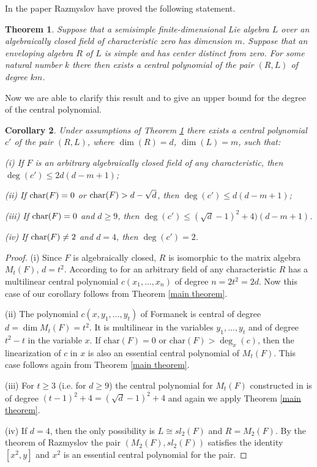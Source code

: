 \documentclass[10]{amsart}
\newtheorem{theorem}{Theorem}[section]
\newtheorem{corollary}[theorem]{Corollary}
\theoremstyle{definition}
\begin{document}
In the paper \cite{R2} Razmyslov have proved the following statement.

\begin{theorem}\label{Razm}
Suppose that a semisimple finite-dimensional Lie algebra $L$ over an
algebraically closed field of characteristic zero has dimension $m$. Suppose that an enveloping
algebra $R$ of $L$ is simple and has center distinct from zero. For some natural
number $k$ there then exists a central polynomial of the pair $(R,L)$ of degree $km$.
\end{theorem}

Now we are able to clarify this result and to give an upper bound for the degree of the central polynomial.

\begin{corollary}\label{upper bound}
Under assumptions of Theorem \ref{Razm} there exists a central polynomial $c'$ of the pair $(R,L)$, where $\dim(R)=d$, $\dim(L)=m$, such that:

{\rm (i)} If $F$ is an arbitrary algebraically closed field of any characteristic, then $\deg(c')\leq 2d(d-m+1)$;

{\rm (ii)} If $\text{\rm char}(F)=0$ or $\text{\rm char}(F)>d-\sqrt{d}$, then $\deg(c')\leq d(d-m+1)$;

{\rm (iii)} If $\text{\rm char}(F)=0$ and $d\geq 9$, then $\deg(c')\leq (\sqrt{d}-1)^2+4)(d-m+1)$.

{\rm (iv)} If $\text{\rm char}(F)\not=2$ and $d=4$, then $\deg(c')=2$.
\end{corollary}

\begin{proof}
(i) Since $F$ is algebraically closed, $R$ is isomorphic to the matrix algebra $M_t(F)$, $d=t^2$.
According to \cite{F3} for an arbitrary field of any characteristic $R$ has a multilinear central polynomial
$c(x_1,\ldots,x_n)$ of degree $n=2t^2=2d$. Now this case of our corollary follows from Theorem
\ref{main theorem}.

(ii) The polynomial $c(x,y_1,\ldots,y_t)$ of Formanek \cite{F1} is central of degree $d=\dim M_t(F)=t^2$. It is multilinear in the variables
$y_1,\ldots,y_t$ and of degree $t^2-t$ in the variable $x$. If $\text{char}(F)=0$ or $\text{char}(F)>\deg_x(c)$, then the linearization of $c$ in $x$
is also an essential central polynomial of $M_t(F)$. This case follows again from Theorem \ref{main theorem}.

(iii) For $t\geq 3$ (i.e. for $d\geq 9$) the central polynomial for $M_t(F)$ constructed in \cite{D1} is of degree $(t-1)^2+4=(\sqrt{d}-1)^2+4$
and again we apply Theorem \ref{main theorem}.

(iv) If $d=4$, then the only possibility is $L\cong sl_2(F)$ and $R=M_2(F)$. By the theorem of Razmyslov \cite{R0} the pair $(M_2(F),sl_2(F))$ satisfies the identity
$[x^2,y]$ and $x^2$ is an essential central polynomial for the pair.
\end{proof}
\end{document}
